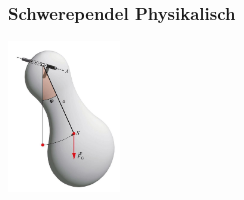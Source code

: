\subsubsection{Schwerependel Physikalisch}
\begin{center}
	\begin{minipage}{0.3\textwidth}
		
	\end{minipage}%
	\begin{minipage}{0.3\textwidth}
		\includegraphics[height=4cm,keepaspectratio=true]{Images/schwerependel_physikalisch.png}
	\end{minipage}
\end{center}

